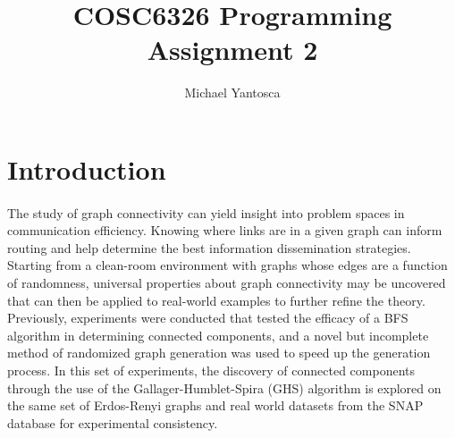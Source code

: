 \documentclass[11pt,epsf]{article}
\date{}
\title{COSC6326 Programming Assignment 2}
\author{Michael Yantosca}
\begin{document}
\maketitle
\tableofcontents

\section{Introduction}{
  \paragraph{}{
    The study of graph connectivity can yield insight into problem spaces in communication
    efficiency. Knowing where links are in a given graph can inform routing and help determine
    the best information dissemination strategies. Starting from a clean-room environment with
    graphs whose edges are a function of randomness, universal properties about
    graph connectivity may be uncovered that can then be applied to real-world examples
    to further refine the theory. Previously, experiments were conducted that tested the efficacy
    of a BFS algorithm in determining connected components, and a novel but incomplete method
    of randomized graph generation was used to speed up the generation process\autocite{bfs-coco}. In this set of experiments,
    the discovery of connected components through the use of the Gallager-Humblet-Spira (GHS) algorithm\autocite[102-106]{DNA}
    is explored on the same set of Erdos-Renyi graphs\autocite[5]{pa2spec} and real world datasets from the
    SNAP database\autocite{SNAP} for experimental consistency.
  }
}
\end{document}
